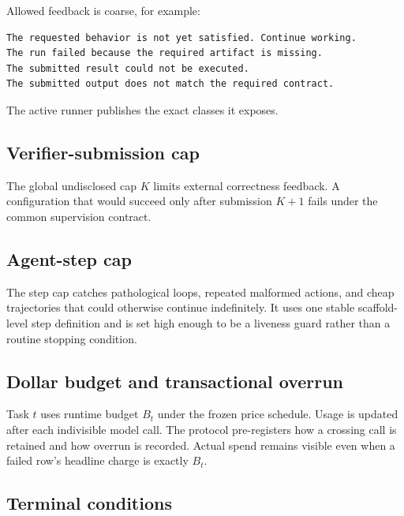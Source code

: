 \documentclass[11pt]{article}
\begin{document}
Allowed feedback is coarse, for example:

\begin{lstlisting}[showspaces=false,showtabs=false,basicstyle=\ttfamily\footnotesize,columns=fixed,frame=tlbr]
The requested behavior is not yet satisfied. Continue working.
The run failed because the required artifact is missing.
The submitted result could not be executed.
The submitted output does not match the required contract.

\end{lstlisting}   %

The active runner publishes the exact classes it exposes.

\subsection{Verifier-submission cap}\hypertarget{73-verifier-submission-cap}{}\label{73-verifier-submission-cap}

The global undisclosed cap $K$ limits external correctness feedback. A configuration that would succeed only after submission $K+1$ fails under the common supervision contract.

\subsection{Agent-step cap}\hypertarget{74-agent-step-cap}{}\label{74-agent-step-cap}

The step cap catches pathological loops, repeated malformed actions, and cheap trajectories that could otherwise continue indefinitely. It uses one stable scaffold-level step definition and is set high enough to be a liveness guard rather than a routine stopping condition.

\subsection{Dollar budget and transactional overrun}\hypertarget{75-dollar-budget-and-transactional-overrun}{}\label{75-dollar-budget-and-transactional-overrun}

Task $t$ uses runtime budget $B_t$ under the frozen price schedule. Usage is updated after each indivisible model call. The protocol pre-registers how a crossing call is retained and how overrun is recorded. Actual spend remains visible even when a failed row's headline charge is exactly $B_t$.

\subsection{Terminal conditions}\hypertarget{76-terminal-conditions}{}\label{76-terminal-conditions}
\end{document}
